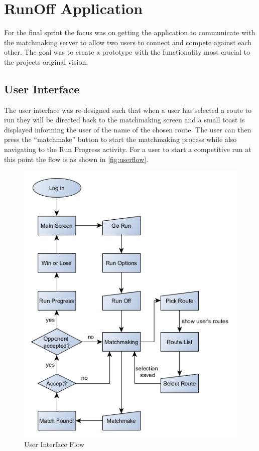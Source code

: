 \section{RunOff Application}
For the final sprint the focus was on getting the application to communicate with the matchmaking server to allow two users to connect and compete against each other. The goal was to create a prototype with the functionality most crucial to the projects original vision.

\subsection{User Interface} 
The user interface was re-designed such that when a user has selected a route to run they will be directed back to the matchmaking screen and a small toast is displayed informing the user of the name of the chosen route. The user can then press the ``matchmake'' button to start the matchmaking process while also navigating to the Run Progress activity. For a user to start a competitive run at this point the flow is as shown in \autoref{fig:userflow}.

\begin{figure}[!ht]
	\begin{center}
		\includegraphics[scale=0.7]{img/runappflow.png}
		\caption{User Interface Flow}
		\label{fig:userflow}
	\end{center}
\end{figure}

